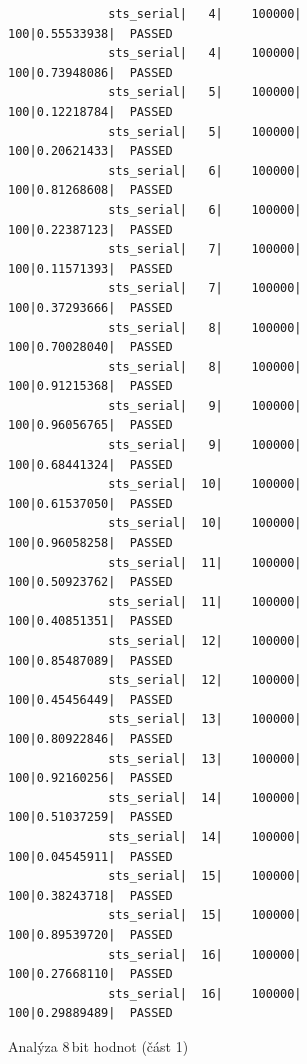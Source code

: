 \documentclass[11pt, a4paper, titlepage]{article}
\begin{document}
\begin{figure}[H]
\begin{verbatim}
              sts_serial|   4|    100000|     100|0.55533938|  PASSED
              sts_serial|   4|    100000|     100|0.73948086|  PASSED
              sts_serial|   5|    100000|     100|0.12218784|  PASSED
              sts_serial|   5|    100000|     100|0.20621433|  PASSED
              sts_serial|   6|    100000|     100|0.81268608|  PASSED
              sts_serial|   6|    100000|     100|0.22387123|  PASSED
              sts_serial|   7|    100000|     100|0.11571393|  PASSED
              sts_serial|   7|    100000|     100|0.37293666|  PASSED
              sts_serial|   8|    100000|     100|0.70028040|  PASSED
              sts_serial|   8|    100000|     100|0.91215368|  PASSED
              sts_serial|   9|    100000|     100|0.96056765|  PASSED
              sts_serial|   9|    100000|     100|0.68441324|  PASSED
              sts_serial|  10|    100000|     100|0.61537050|  PASSED
              sts_serial|  10|    100000|     100|0.96058258|  PASSED
              sts_serial|  11|    100000|     100|0.50923762|  PASSED
              sts_serial|  11|    100000|     100|0.40851351|  PASSED
              sts_serial|  12|    100000|     100|0.85487089|  PASSED
              sts_serial|  12|    100000|     100|0.45456449|  PASSED
              sts_serial|  13|    100000|     100|0.80922846|  PASSED
              sts_serial|  13|    100000|     100|0.92160256|  PASSED
              sts_serial|  14|    100000|     100|0.51037259|  PASSED
              sts_serial|  14|    100000|     100|0.04545911|  PASSED
              sts_serial|  15|    100000|     100|0.38243718|  PASSED
              sts_serial|  15|    100000|     100|0.89539720|  PASSED
              sts_serial|  16|    100000|     100|0.27668110|  PASSED
              sts_serial|  16|    100000|     100|0.29889489|  PASSED
    \end{verbatim}
    \caption{Analýza 8\,bit hodnot (část 1)}
    \label{tab:analysis_8b_1}
\end{figure}


\newpage
\end{document}
